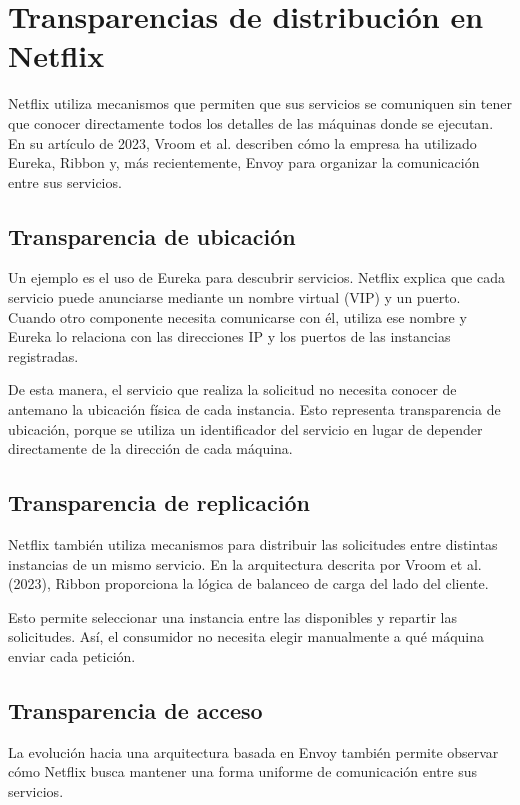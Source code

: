 
\section{Transparencias de distribución en Netflix}

Netflix utiliza mecanismos que permiten que sus servicios se comuniquen sin tener que conocer directamente todos los detalles de las máquinas donde se ejecutan. En su artículo de 2023, Vroom et al. describen cómo la empresa ha utilizado Eureka, Ribbon y, más recientemente, Envoy para organizar la comunicación entre sus servicios.

\subsection{Transparencia de ubicación}

Un ejemplo es el uso de Eureka para descubrir servicios. Netflix explica que cada servicio puede anunciarse mediante un nombre virtual (VIP) y un puerto. Cuando otro componente necesita comunicarse con él, utiliza ese nombre y Eureka lo relaciona con las direcciones IP y los puertos de las instancias registradas.

De esta manera, el servicio que realiza la solicitud no necesita conocer de antemano la ubicación física de cada instancia. Esto representa transparencia de ubicación, porque se utiliza un identificador del servicio en lugar de depender directamente de la dirección de cada máquina.

\subsection{Transparencia de replicación}

Netflix también utiliza mecanismos para distribuir las solicitudes entre distintas instancias de un mismo servicio. En la arquitectura descrita por Vroom et al. (2023), Ribbon proporciona la lógica de balanceo de carga del lado del cliente.

Esto permite seleccionar una instancia entre las disponibles y repartir las solicitudes. Así, el consumidor no necesita elegir manualmente a qué máquina enviar cada petición.

\subsection{Transparencia de acceso}

La evolución hacia una arquitectura basada en Envoy también permite observar cómo Netflix busca mantener una forma uniforme de comunicación entre sus servicios.

